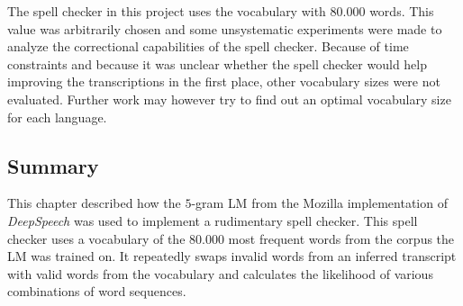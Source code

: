 The spell checker in this project uses the vocabulary with $80.000$ words. This value was arbitrarily chosen and some unsystematic experiments were made to analyze the correctional capabilities of the spell checker. Because of time constraints and because it was unclear whether the spell checker would help improving the transcriptions in the first place, other vocabulary sizes were not evaluated. Further work may however try to find out an optimal vocabulary size for each language.

\subsection{Summary}

This chapter described how the $5$-gram \ac{LM} from the Mozilla implementation of \textit{DeepSpeech} was used to implement a rudimentary spell checker. This spell checker uses a vocabulary of the $80.000$ most frequent words from the corpus the \ac{LM} was trained on. It repeatedly swaps invalid words from an inferred transcript with valid words from the vocabulary and calculates the likelihood of various combinations of word sequences.